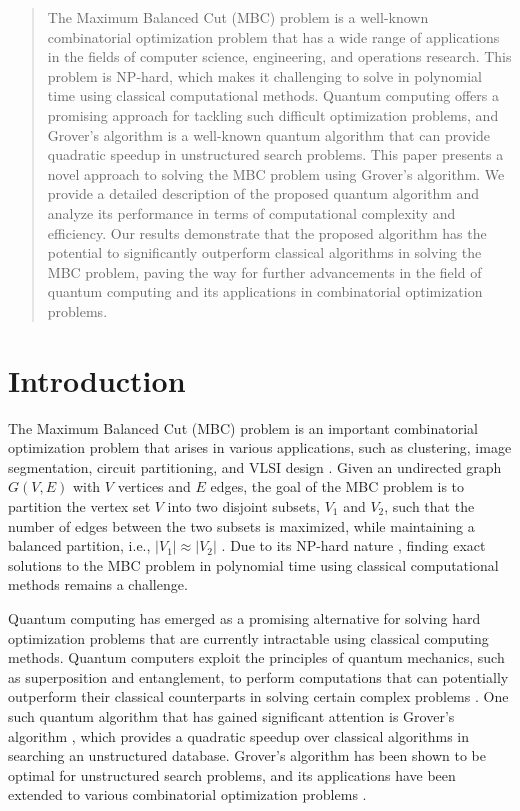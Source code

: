 \begin{abstract}
The Maximum Balanced Cut (MBC) problem is a well-known combinatorial optimization problem that has a wide range of applications in the fields of computer science, engineering, and operations research. This problem is NP-hard, which makes it challenging to solve in polynomial time using classical computational methods. Quantum computing offers a promising approach for tackling such difficult optimization problems, and Grover's algorithm is a well-known quantum algorithm that can provide quadratic speedup in unstructured search problems. This paper presents a novel approach to solving the MBC problem using Grover's algorithm. We provide a detailed description of the proposed quantum algorithm and analyze its performance in terms of computational complexity and efficiency. Our results demonstrate that the proposed algorithm has the potential to significantly outperform classical algorithms in solving the MBC problem, paving the way for further advancements in the field of quantum computing and its applications in combinatorial optimization problems.

\end{abstract}

\section{Introduction}

The Maximum Balanced Cut (MBC) problem is an important combinatorial optimization problem that arises in various applications, such as clustering, image segmentation, circuit partitioning, and VLSI design \cite{1}. Given an undirected graph $G(V, E)$ with $V$ vertices and $E$ edges, the goal of the MBC problem is to partition the vertex set $V$ into two disjoint subsets, $V_1$ and $V_2$, such that the number of edges between the two subsets is maximized, while maintaining a balanced partition, i.e., $|V_1| \approx |V_2|$ \cite{2}. Due to its NP-hard nature \cite{3}, finding exact solutions to the MBC problem in polynomial time using classical computational methods remains a challenge.

Quantum computing has emerged as a promising alternative for solving hard optimization problems that are currently intractable using classical computing methods. Quantum computers exploit the principles of quantum mechanics, such as superposition and entanglement, to perform computations that can potentially outperform their classical counterparts in solving certain complex problems \cite{4}. One such quantum algorithm that has gained significant attention is Grover's algorithm \cite{5}, which provides a quadratic speedup over classical algorithms in searching an unstructured database. Grover's algorithm has been shown to be optimal for unstructured search problems, and its applications have been extended to various combinatorial optimization problems \cite{6}.

